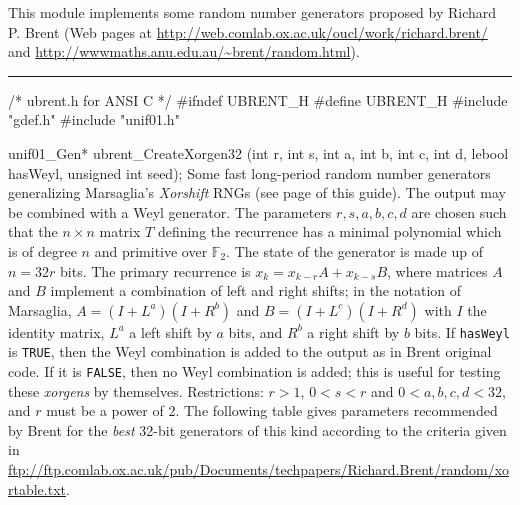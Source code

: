 
This module implements some random number generators proposed by Richard
  P. Brent (Web pages at %
\url{http://web.comlab.ox.ac.uk/oucl/work/richard.brent/}
and \url{http://wwwmaths.anu.edu.au/~brent/random.html}).


\bigskip
\hrule
\code\hide
/* ubrent.h for ANSI C */
#ifndef UBRENT_H
#define UBRENT_H
\endhide
#include "gdef.h"
#include "unif01.h"
\endcode

\code

unif01_Gen* ubrent_CreateXorgen32 (int r, int s, int a, int b, int c, int d,
                                   lebool hasWeyl, unsigned int seed);
\endcode
  \tab Some fast long-period random number generators \cite{rBRE04a} 
        generalizing Marsaglia's \textit{Xorshift} RNGs \cite{rMAR03a} 
 (see page \pageref{marsa-xorshift} of this guide).  The
   output may be combined with a Weyl generator.
 The parameters $r, s, a, b,  c, d$ are chosen such that the $n \times n$
   matrix $T$ defining the recurrence has a minimal polynomial which
%
      is of degree $n$ and primitive over $\mathbb{F}_2$. 
The state of the generator is made up of $n= 32 r$ bits.
The primary recurrence is $x_k = x_{k-r}A + x_{k-s}B$, where matrices
$A$ and $B$ implement a combination of left and right shifts;
 in the notation of Marsaglia, $A = (I + L^a)(I + R^b)$ and
 $B = (I + L^c)(I + R^d)$ with
 $I$ the identity matrix, $L^a$ a left shift by $a$ bits, 
and $R^b$ a right shift by $b$ bits. If \texttt{hasWeyl} is \texttt{TRUE},
then the Weyl combination is added to the output as in Brent original
code. If it is  \texttt{FALSE}, then no Weyl combination is added;
 this is useful for testing these \textit{xorgens} by themselves.
Restrictions: $r > 1$, $0 < s < r$ and $0 < a,b,c,d < 32$,
and $r$ must be a power of 2.
%
The following table gives parameters recommended by Brent
for the \textit{best} 32-bit generators of this kind
according to the criteria given in \url{ftp://ftp.comlab.ox.ac.uk/pub/Documents/techpapers/Richard.Brent/random/xortable.txt}.
\endtab
%
